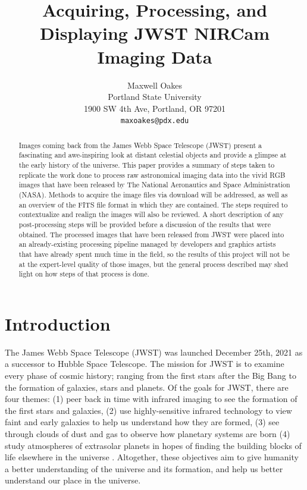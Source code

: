 \documentclass[10pt,twocolumn,letterpaper]{article}
\begin{document}
\title{Acquiring, Processing, and Displaying JWST NIRCam Imaging Data}
\cvprfinaltrue

\author{Maxwell Oakes\\
Portland State University\\
1900 SW 4th Ave, Portland, OR 97201\\
{\tt\small maxoakes@pdx.edu}}
\maketitle

\begin{abstract}
  Images coming back from the James Webb Space Telescope (JWST) present a fascinating and awe-inspiring look at distant celestial objects and provide a glimpse at the early history of the universe. 
  This paper provides a summary of steps taken to replicate the work done to process raw astronomical imaging data into the vivid RGB images that have been released by The National Aeronautics and Space Administration (NASA). 
  Methods to acquire the image files via download will be addressed, as well as an overview of the FITS file format in which they are contained.
  The steps required to contextualize and realign the images will also be reviewed. A short description of any post-processing steps will be provided before a discussion of the results that were obtained.
  The processed images that have been released from JWST were placed into an already-existing processing pipeline managed by developers and graphics artists that have already spent much time in the field, so the results of this project will not be at the expert-level quality of those images, but the general process described may shed light on how steps of that process is done.
\end{abstract}

\section{Introduction}
\label{sec:intro}

The James Webb Space Telescope (JWST) was launched December 25th, 2021 as a successor to Hubble Space Telescope. The mission for JWST is to examine every phase of cosmic history; ranging from the first stars after the Big Bang to the formation of galaxies, stars and planets. Of the goals for JWST, there are four themes: 
(1) peer back in time with infrared imaging to see the formation of the first stars and galaxies, 
(2) use highly-sensitive infrared technology to view faint and early galaxies to help us understand how they are formed,
(3) see through clouds of dust and gas to observe how planetary systems are born
(4) study atmospheres of extrasolar planets in hopes of finding the building blocks of life elsewhere in the universe \cite{webbobjective}.
Altogether, these objectives aim to give humanity a better understanding of the universe and its formation, and help us better understand our place in the universe.
\end{document}
